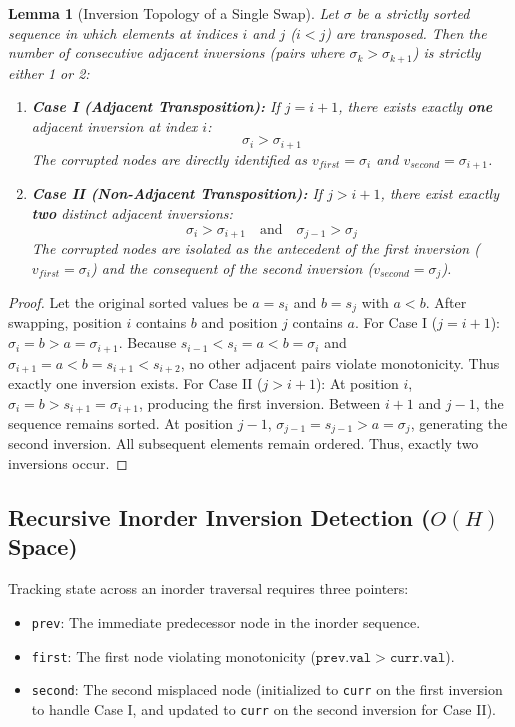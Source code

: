 \documentclass[10pt,twocolumn,letterpaper]{article}
\newtheorem{lemma}[theorem]{Lemma}
\begin{document}
\begin{lemma}[Inversion Topology of a Single Swap]
Let $\sigma$ be a strictly sorted sequence in which elements at indices $i$ and $j$ ($i < j$) are transposed. Then the number of consecutive adjacent inversions (pairs where $\sigma_k > \sigma_{k+1}$) is strictly either 1 or 2:
\begin{enumerate}
    \item \textbf{Case I (Adjacent Transposition):} If $j = i + 1$, there exists exactly \textbf{one} adjacent inversion at index $i$:
    \[
    \sigma_i > \sigma_{i+1}
    \]
    The corrupted nodes are directly identified as $v_{first} = \sigma_i$ and $v_{second} = \sigma_{i+1}$.
    \item \textbf{Case II (Non-Adjacent Transposition):} If $j > i + 1$, there exist exactly \textbf{two} distinct adjacent inversions:
    \[
    \sigma_i > \sigma_{i+1} \quad \text{and} \quad \sigma_{j-1} > \sigma_j
    \]
    The corrupted nodes are isolated as the antecedent of the first inversion ($v_{first} = \sigma_i$) and the consequent of the second inversion ($v_{second} = \sigma_j$).
\end{enumerate}
\end{lemma}

\begin{proof}
Let the original sorted values be $a = s_i$ and $b = s_j$ with $a < b$. After swapping, position $i$ contains $b$ and position $j$ contains $a$.
For Case I ($j = i+1$):
$\sigma_i = b > a = \sigma_{i+1}$. Because $s_{i-1} < s_i = a < b = \sigma_i$ and $\sigma_{i+1} = a < b = s_{i+1} < s_{i+2}$, no other adjacent pairs violate monotonicity. Thus exactly one inversion exists.
For Case II ($j > i+1$):
At position $i$, $\sigma_i = b > s_{i+1} = \sigma_{i+1}$, producing the first inversion. Between $i+1$ and $j-1$, the sequence remains sorted. At position $j-1$, $\sigma_{j-1} = s_{j-1} > a = \sigma_j$, generating the second inversion. All subsequent elements remain ordered. Thus, exactly two inversions occur.
\end{proof}

\subsection{Recursive Inorder Inversion Detection ($O(H)$ Space)}

Tracking state across an inorder traversal requires three pointers:
\begin{itemize}
    \item \texttt{prev}: The immediate predecessor node in the inorder sequence.
    \item \texttt{first}: The first node violating monotonicity ($\texttt{prev}.\texttt{val} > \texttt{curr}.\texttt{val}$).
    \item \texttt{second}: The second misplaced node (initialized to \texttt{curr} on the first inversion to handle Case I, and updated to \texttt{curr} on the second inversion for Case II).
\end{itemize}
\end{document}
